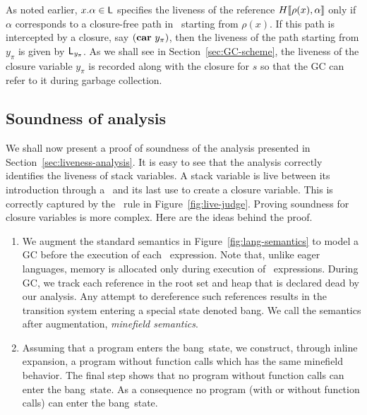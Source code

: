 \documentclass[9pt,preprint,nonatbib]{sigplanconf}
\newcommand{\added}[1]{#1}
\newcommand{\bang}{\mbox{\sc bang}}
\begin{document}
\added{  As noted  earlier, $x.\alpha  \in \mathsf{L}$  specifies the
  liveness of the reference $H\llbracket\rho(x), \alpha\rrbracket$
  only   if   $\alpha$  corresponds   to   a   closure-free  path   in
  \heap\ starting  from $\rho(x)$.  If  this path is intercepted  by a
  closure,  say  $(\mbox{$\mathbf{car}$}~{y_{\pi}})$, then  the  liveness  of the  path
  starting from $\mathit{y_{\pi}}$ is given by $\mathsf{L}_\mathit{y_{\pi}}$.
  As we shall see in  Section~\ref{sec:GC-scheme}, the liveness of the
  closure variable  $y_{\pi}$ is recorded  along with the  closure for
  $s$ so that the GC can refer to it during garbage collection.  }

\subsection{Soundness of analysis}  

We shall now present a proof of soundness of the analysis presented in
Section~\ref{sec:liveness-analysis}. \added{It is easy to see that the analysis
correctly identifies the liveness of stack variables. A stack variable
is live
between its introduction through a \LET\  and its last use to
create a closure variable. This is correctly captured by the
\LET\ rule in Figure~\ref{fig:live-judge}.}
Proving soundness  for closure  variables is more complex. Here  are the
ideas behind the proof. 
\begin{enumerate}
\item      We     augment      the      standard     semantics      in
  Figure~\ref{fig:lang-semantics} to  model a GC before  the execution
  of  each \LET\  expression.  \added{Note  that, unlike  eager
    languages,   memory  is   allocated  only   during  execution   of
    \LET\ expressions}. During GC, we track each reference in the root
  set and heap that is declared  dead by our analysis.  Any attempt to
  dereference  such  references  results   in  the  transition  system
  entering a special state denoted \bang.  We call the semantics after
  augmentation, \emph{minefield semantics}.

\item \label{inline1} Assuming that a program enters the \bang\ state,
  we  construct,  through  inline expansion,  a  program
  without function  calls which has  the same minefield  behavior. The
  final step shows that no program  without function calls can enter the
  \bang\ state. As a consequence  no program (with or without function
  calls) can enter the \bang\ state.
\end{enumerate}
\end{document}
